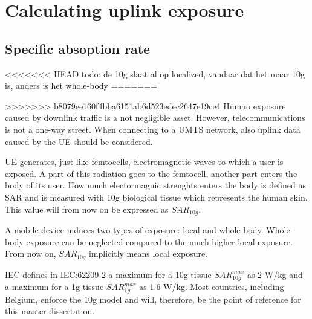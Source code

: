 



\section{Calculating uplink exposure}
\subsection{Specific absoption rate}
<<<<<<< HEAD
todo: de 10g slaat al op localized, vandaar dat het maar 10g is, anders is het whole-body
=======
\label{sec:sar}

>>>>>>> b8079ee160f4bba6151ab6d523edec2647e19ce4
Human exposure caused by downlink traffic is a not negligible asset. However, telecommunications is not a one-way street. When connecting to a UMTS network, also uplink data caused by the \gls{UE} should be considered.

\gls{UE} generates, just like femtocells, electromagnetic waves to which a user is exposed. A part of this radiation goes to the femtocell, another part enters the body of its user. How much electormagnic strenghts enters the body is defined as \gls{SAR} and is measured with 10g biological tissue which represents the human skin. This value will from now on be expressed as $SAR_{10g}$. 

A mobile device induces two types of exposure: local and whole-body. Whole-body exposure can be neglected compared to the much higher local exposure\cite{j10.1.1_gati2010duality}.  From now on, $SAR_{10g}$ implicitly means local exposure.

\gls{IEC} defines in IEC:62209-2 a maximum for a 10g tissue $SAR^{max}_{10g}$ as 2 W/kg and a maximum for a 1g tissue $SAR^{max}_{1g}$ as 1.6 W/kg. Most countries, including Belgium, enforce the 10g model and will, therefore, be the point of reference for this master dissertation.

